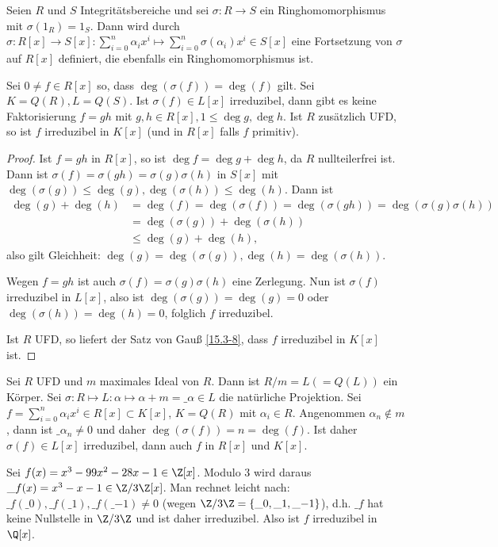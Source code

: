 \begin{st}[Reduktionskriterium] \label{15.3-12}
	Seien $R$ und $S$ Integritätsbereiche und sei $\sigma: R \to S$ ein Ringhomomorphismus mit $\sigma(1_R) = 1_S$.
	Dann wird durch $\sigma: R[x] \to S[x] : \sum_{i=0}^n \alpha_i x^i \mapsto \sum_{i=0}^n \sigma(\alpha_i) x^i \in S[x]$ eine Fortsetzung von $\sigma$ auf $R[x]$ definiert, die ebenfalls ein Ringhomomorphismus ist.

	Sei $0 \neq f \in R[x]$ so, dass $\deg(\sigma(f)) = \deg(f)$ gilt.
	Sei $K = Q(R), L = Q(S)$.
	Ist $\sigma(f) \in L[x]$ irreduzibel, dann gibt es keine Faktorisierung $f = gh$ mit $g, h \in R[x], 1 \le \deg g, \deg h$.
	Ist $R$ zusätzlich UFD, so ist $f$ irreduzibel in $K[x]$ (und in $R[x]$ falls $f$ primitiv).
	\begin{proof}
		Ist $f = gh$ in $R[x]$, so ist $\deg f = \deg g + \deg h$, da $R$ nullteilerfrei ist.
		Dann ist $\sigma(f) = \sigma(gh) = \sigma(g)\sigma(h)$ in $S[x]$ mit $\deg(\sigma(g)) \le \deg(g), \deg(\sigma(h)) \le \deg(h)$.
		Dann ist
		\begin{align*}
			\deg(g) + \deg(h)
			&= \deg(f)
			= \deg(\sigma(f))
			= \deg(\sigma(gh))
			= \deg(\sigma(g)\sigma(h)) \\
			&= \deg(\sigma(g)) + \deg(\sigma(h)) \\
			&\le \deg(g) + \deg(h),
		\end{align*}
		also gilt Gleichheit: $\deg(g) = \deg(\sigma(g)), \deg(h) = \deg(\sigma(h))$.

		Wegen $f = gh$ ist auch $\sigma(f) = \sigma(g)\sigma(h)$ eine Zerlegung.
		Nun ist $\sigma(f)$ irreduzibel in $L[x]$, also ist $\deg(\sigma(g)) = \deg(g) = 0$ oder $\deg(\sigma(h)) = \deg(h) = 0$, folglich $f$ irreduzibel.

		Ist $R$ UFD, so liefert der Satz von Gauß \ref{15.3-8}, dass $f$ irreduzibel in $K[x]$ ist.
	\end{proof}
\end{st}

\begin{ex} \label{15.3-13}
	Sei $R$ UFD und $m$ maximales Ideal von $R$.
	Dann ist $R / m = L (= Q(L))$ ein Körper.
	Sei $\sigma: R \mapsto L: \alpha \mapsto \alpha + m = \_\alpha \in L$ die natürliche Projektion.
	Sei $f = \sum_{i=0}^n \alpha_i x^i \in R[x] \subset K[x]$, $K = Q(R)$ mit $\alpha_i \in R$.
	Angenommen $\alpha_n \not\in m$, dann ist $\_{\alpha_n} \neq 0$ und daher $\deg(\sigma(f)) = n = \deg(f)$.
	Ist daher $\sigma(f) \in L[x]$ irreduzibel, dann auch $f$ in $R[x]$ und $K[x]$.
	\begin{ex*}
		Sei $f(x) = x^3 - 99x^2 - 28x - 1 \in \Z[x]$.
		Modulo 3 wird daraus $\_f(x) = x^3 - x - 1 \in \Z / 3\Z[x]$.
		Man rechnet leicht nach: $\_f(\_0), \_f(\_1), \_f(\_{-1}) \neq 0$ (wegen $\Z / 3\Z = \{\_0, \_1, \_{-1}\}$), d.h. $\_f$ hat keine Nullstelle in $\Z / 3\Z$ und ist daher irreduzibel.
		Also ist $f$ irreduzibel in $\Q[x]$.
	\end{ex*}
\end{ex}

